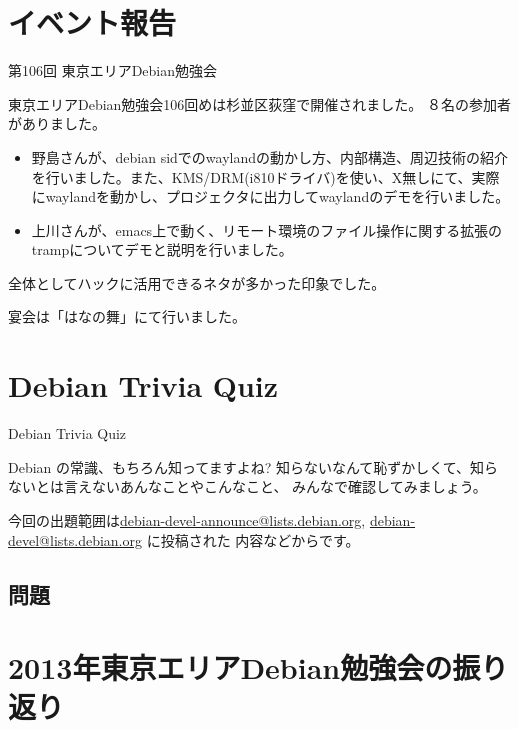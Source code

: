 \section{イベント報告}

\begin{frame}{第106回 東京エリアDebian勉強会}

 東京エリアDebian勉強会106回めは杉並区荻窪で開催されました。
８名の参加者がありました。

\begin{itemize}
\item 野島さんが、debian sidでのwaylandの動かし方、内部構造、周辺技術の紹介を行いました。また、KMS/DRM(i810ドライバ)を使い、X無しにて、実際にwaylandを動かし、プロジェクタに出力してwaylandのデモを行いました。
\item 上川さんが、emacs上で動く、リモート環境のファイル操作に関する拡張のtrampについてデモと説明を行いました。
\end{itemize}

 全体としてハックに活用できるネタが多かった印象でした。
 
 宴会は「はなの舞」にて行いました。


\end{frame}

\section{Debian Trivia Quiz}
\begin{frame}{Debian Trivia Quiz}

  Debian の常識、もちろん知ってますよね?
知らないなんて恥ずかしくて、知らないとは言えないあんなことやこんなこと、
みんなで確認してみましょう。

今回の出題範囲は\url{debian-devel-announce@lists.debian.org},
\url{debian-devel@lists.debian.org} に投稿された
内容などからです。

\end{frame}

\subsection{問題}
 

\section{2013年東京エリアDebian勉強会の振り返り}


